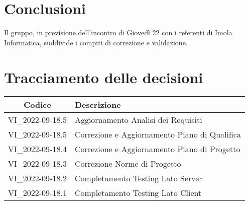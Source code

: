 \section{Conclusioni}
Il gruppo, in previsione dell'incontro di Giovedì 22 con i referenti di Imola Informatica, suddivide i compiti di correzione e validazione.
\newpage

\section*{Tracciamento delle decisioni}
	\renewcommand{\arraystretch}{1.8} %
	\begin{tabular}{ |c|l| }
		\hline
		\textbf{Codice} & \textbf{Descrizione} \\
    \hline
		VI\_2022-09-18.5 & Aggiornamento Analisi dei Requisiti\\ %
    \hline
		VI\_2022-09-18.5 & Correzione e Aggiornamento Piano di Qualifica\\ %
		\hline
		VI\_2022-09-18.4 & Correzione e Aggiornamento Piano di Progetto\\ %
    \hline
		VI\_2022-09-18.3 & Correzione Norme di Progetto\\ %
    \hline
		VI\_2022-09-18.2 & Completamento Testing Lato Server\\ %
    \hline
		VI\_2022-09-18.1 & Completamento Testing Lato Client \\ %
		\hline
	\end{tabular}